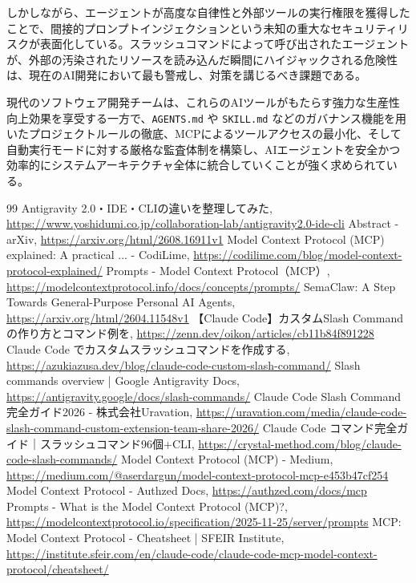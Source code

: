 \documentclass[a4paper,11pt]{ltjsarticle}
\newcommand{\cmd}[1]{\texttt{#1}}
\begin{document}
しかしながら、エージェントが高度な自律性と外部ツールの実行権限を獲得したことで、間接的プロンプトインジェクションという未知の重大なセキュリティリスクが表面化している。スラッシュコマンドによって呼び出されたエージェントが、外部の汚染されたリソースを読み込んだ瞬間にハイジャックされる危険性は、現在のAI開発において最も警戒し、対策を講じるべき課題である。

現代のソフトウェア開発チームは、これらのAIツールがもたらす強力な生産性向上効果を享受する一方で、\cmd{AGENTS.md} や \cmd{SKILL.md} などのガバナンス機能を用いたプロジェクトルールの徹底、MCPによるツールアクセスの最小化、そして自動実行モードに対する厳格な監査体制を構築し、AIエージェントを安全かつ効率的にシステムアーキテクチャ全体に統合していくことが強く求められている。

\begin{thebibliography}{99}
\small
{} Antigravity 2.0・IDE・CLIの違いを整理してみた, \url{https://www.yoshidumi.co.jp/collaboration-lab/antigravity2.0-ide-cli}
 Abstract - arXiv, \url{https://arxiv.org/html/2608.16911v1}
 Model Context Protocol (MCP) explained: A practical ... - CodiLime, \url{https://codilime.com/blog/model-context-protocol-explained/}
 Prompts - Model Context Protocol（MCP）, \url{https://modelcontextprotocol.info/docs/concepts/prompts/}
 SemaClaw: A Step Towards General-Purpose Personal AI Agents, \url{https://arxiv.org/html/2604.11548v1}
 【Claude Code】カスタムSlash Commandの作り方とコマンド例を, \url{https://zenn.dev/oikon/articles/cb11b84f891228}
 Claude Code でカスタムスラッシュコマンドを作成する, \url{https://azukiazusa.dev/blog/claude-code-custom-slash-command/}
 Slash commands overview | Google Antigravity Docs, \url{https://antigravity.google/docs/slash-commands/}
 Claude Code Slash Command完全ガイド2026 - 株式会社Uravation, \url{https://uravation.com/media/claude-code-slash-command-custom-extension-team-share-2026/}
 Claude Code コマンド完全ガイド｜スラッシュコマンド96個+CLI, \url{https://crystal-method.com/blog/claude-code-slash-commands/}
 Model Context Protocol (MCP) - Medium, \url{https://medium.com/@aserdargun/model-context-protocol-mcp-e453b47cf254}
 Model Context Protocol - Authzed Docs, \url{https://authzed.com/docs/mcp}
 Prompts - What is the Model Context Protocol (MCP)?, \url{https://modelcontextprotocol.io/specification/2025-11-25/server/prompts}
 MCP: Model Context Protocol - Cheatsheet | SFEIR Institute, \url{https://institute.sfeir.com/en/claude-code/claude-code-mcp-model-context-protocol/cheatsheet/}

\end{thebibliography}
\end{document}
